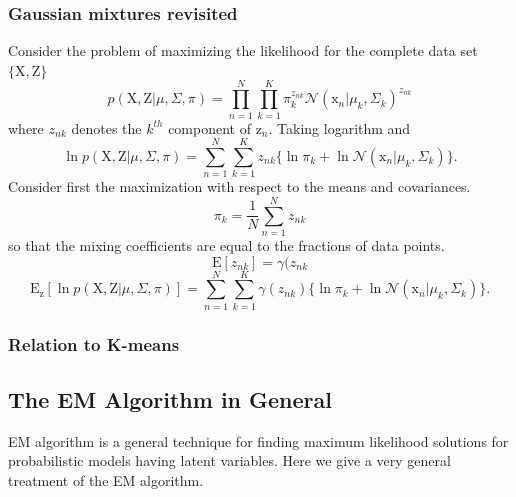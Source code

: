 \documentclass[a4paper]{book}
\newcommand{\normD}{\mathcal{N}}
\newcommand{\mrm}{\mathrm}
\begin{document}
\subsubsection*{Gaussian mixtures revisited}
Consider the problem of maximizing the likelihood for the complete data set $\{\mrm X,\mrm Z\}$
\begin{equation}\label{}
  p(\mrm{X,Z}|\mu,\Sigma,\pi) = \prod_{n=1}^{N}\prod_{k=1}^{K}\pi_k^{z_{nk}}\normD(\mrm x_n|\mu_k,\Sigma_k)^{z_{nk}}
\end{equation}
where $z_{nk}$ denotes the $k^{th}$ component of $\mrm z_n$. Taking logarithm and
\begin{equation}\label{}
  \ln p(\mrm{X,Z}|\mu,\Sigma,\pi) = \sum_{n=1}^{N}\sum_{k=1}^{K}z_{nk}\{\ln \pi_k+\ln\normD(\mrm x_n|\mu_k,\Sigma_k)\}.
\end{equation}
Consider first the maximization with respect to the means and covariances.
\begin{equation}\label{}
  \pi_k = \frac1N\sum_{n=1}^{N}z_{nk}
\end{equation}
so that the mixing coefficients are equal to the fractions of data points.
\begin{equation}\label{}
  \mrm E[z_{nk}] = \gamma(z_{nk}
\end{equation}
\begin{equation}\label{}
  \mrm E_{\mrm z}[\ln p(\mrm X,\mrm Z|\mu,\Sigma,\pi)] =\sum_{n=1}^{N}\sum_{k=1}^{K}\gamma(z_{nk})\{\ln \pi_k+\ln \normD(\mrm x_n|\mu_k,\Sigma_k)\}.
\end{equation}

\subsubsection*{Relation to K-means}

\subsection{The EM Algorithm in General}
EM algorithm is a general technique for finding maximum likelihood solutions for probabilistic models having latent variables. Here we give a very general treatment of the EM algorithm.
\end{document}
